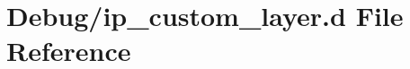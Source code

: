 \hypertarget{ip__custom__layer_8d}{}\section{Debug/ip\+\_\+custom\+\_\+layer.d File Reference}
\label{ip__custom__layer_8d}

